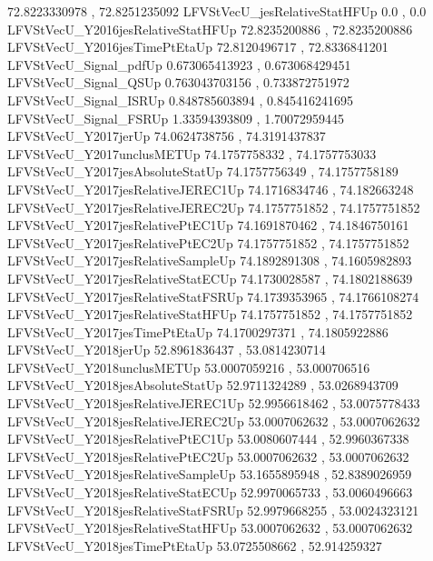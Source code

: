 72.8223330978 , 72.8251235092
LFVStVecU_jesRelativeStatHFUp
0.0 , 0.0
LFVStVecU_Y2016jesRelativeStatHFUp
72.8235200886 , 72.8235200886
LFVStVecU_Y2016jesTimePtEtaUp
72.8120496717 , 72.8336841201
LFVStVecU_Signal_pdfUp
0.673065413923 , 0.673068429451
LFVStVecU_Signal_QSUp
0.763043703156 , 0.733872751972
LFVStVecU_Signal_ISRUp
0.848785603894 , 0.845416241695
LFVStVecU_Signal_FSRUp
1.33594393809 , 1.70072959445
LFVStVecU_Y2017jerUp
74.0624738756 , 74.3191437837
LFVStVecU_Y2017unclusMETUp
74.1757758332 , 74.1757753033
LFVStVecU_Y2017jesAbsoluteStatUp
74.1757756349 , 74.1757758189
LFVStVecU_Y2017jesRelativeJEREC1Up
74.1716834746 , 74.182663248
LFVStVecU_Y2017jesRelativeJEREC2Up
74.1757751852 , 74.1757751852
LFVStVecU_Y2017jesRelativePtEC1Up
74.1691870462 , 74.1846750161
LFVStVecU_Y2017jesRelativePtEC2Up
74.1757751852 , 74.1757751852
LFVStVecU_Y2017jesRelativeSampleUp
74.1892891308 , 74.1605982893
LFVStVecU_Y2017jesRelativeStatECUp
74.1730028587 , 74.1802188639
LFVStVecU_Y2017jesRelativeStatFSRUp
74.1739353965 , 74.1766108274
LFVStVecU_Y2017jesRelativeStatHFUp
74.1757751852 , 74.1757751852
LFVStVecU_Y2017jesTimePtEtaUp
74.1700297371 , 74.1805922886
LFVStVecU_Y2018jerUp
52.8961836437 , 53.0814230714
LFVStVecU_Y2018unclusMETUp
53.0007059216 , 53.000706516
LFVStVecU_Y2018jesAbsoluteStatUp
52.9711324289 , 53.0268943709
LFVStVecU_Y2018jesRelativeJEREC1Up
52.9956618462 , 53.0075778433
LFVStVecU_Y2018jesRelativeJEREC2Up
53.0007062632 , 53.0007062632
LFVStVecU_Y2018jesRelativePtEC1Up
53.0080607444 , 52.9960367338
LFVStVecU_Y2018jesRelativePtEC2Up
53.0007062632 , 53.0007062632
LFVStVecU_Y2018jesRelativeSampleUp
53.1655895948 , 52.8389026959
LFVStVecU_Y2018jesRelativeStatECUp
52.9970065733 , 53.0060496663
LFVStVecU_Y2018jesRelativeStatFSRUp
52.9979668255 , 53.0024323121
LFVStVecU_Y2018jesRelativeStatHFUp
53.0007062632 , 53.0007062632
LFVStVecU_Y2018jesTimePtEtaUp
53.0725508662 , 52.914259327

